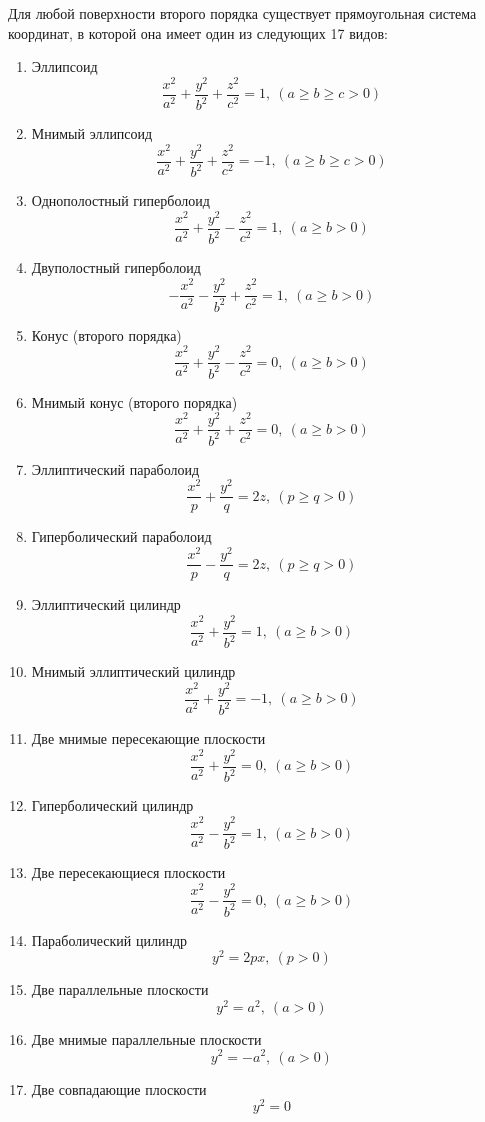 \begin{theorem}
  Для любой поверхности второго порядка существует прямоугольная система координат, в которой она имеет один из следующих 17 видов:
  \begin{enumerate}
    \item Эллипсоид $$
      \frac{x^2}{a^2} + \frac{y^2}{b^2} + \frac{z^2}{c^2} = 1, ~(a \geq b \geq c > 0)
    $$
    \item Мнимый эллипсоид $$
      \frac{x^2}{a^2} + \frac{y^2}{b^2} + \frac{z^2}{c^2} = -1, ~(a \geq b \geq c > 0)
    $$
    \item Однополостный гиперболоид $$
      \frac{x^2}{a^2} + \frac{y^2}{b^2} - \frac{z^2}{c^2} = 1, ~(a \geq b > 0)
    $$
    \item Двуполостный гиперболоид $$
      -\frac{x^2}{a^2} - \frac{y^2}{b^2} + \frac{z^2}{c^2} = 1, ~(a \geq b > 0)
    $$
    \item Конус (второго порядка) $$
      \frac{x^2}{a^2} + \frac{y^2}{b^2} - \frac{z^2}{c^2} = 0, ~(a \geq b > 0)
    $$
    \item Мнимый конус (второго порядка) $$
      \frac{x^2}{a^2} + \frac{y^2}{b^2} + \frac{z^2}{c^2} = 0, ~(a \geq b > 0)
    $$
    \item Эллиптический параболоид $$
      \frac{x^2}{p} + \frac{y^2}{q} = 2z, ~(p \geq q > 0)
    $$
    \item Гиперболический параболоид $$
      \frac{x^2}{p} - \frac{y^2}{q} = 2z, ~(p \geq q > 0)
    $$
    \item Эллиптический цилиндр $$
      \frac{x^2}{a^2} + \frac{y^2}{b^2} = 1, ~(a \geq b > 0)      
    $$
    \item Мнимый эллиптический цилиндр $$
      \frac{x^2}{a^2} + \frac{y^2}{b^2} = -1, ~(a \geq b > 0)      
    $$
    \item Две мнимые пересекающие плоскости $$
      \frac{x^2}{a^2} + \frac{y^2}{b^2} = 0, ~(a \geq b > 0)      
    $$
    \item Гиперболический цилиндр $$
      \frac{x^2}{a^2} - \frac{y^2}{b^2} = 1, ~(a \geq b > 0)      
    $$
    \item Две пересекающиеся плоскости $$
      \frac{x^2}{a^2} - \frac{y^2}{b^2} = 0, ~(a \geq b > 0)      
    $$
    \item Параболический цилиндр $$
      y^2 = 2px, ~ (p > 0)
    $$
    \item Две параллельные плоскости $$
      y^2 = a^2, ~ (a > 0)
    $$
    \item Две мнимые параллельные плоскости $$
      y^2 = -a^2, ~ (a > 0)
    $$
    \item Две совпадающие плоскости $$
      y^2 = 0
    $$
  \end{enumerate}
\end{theorem}

